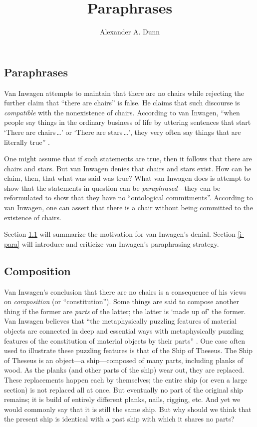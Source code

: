 \documentclass[11pt]{article}
\title{Paraphrases}
\author{Alexander A. Dunn}
\begin{document}
\ifstandalone
\maketitle
\begin{spacing}{1.5}
\fi

\section{Paraphrases}
\label{van-paraphrase}
Van Inwagen attempts to maintain that there are no chairs while
rejecting the further claim that ``there are chairs'' is false.  He
claims that such discourse is {\em compatible} with the nonexistence
of chairs.  According to van Inwagen, ``when people say things in the
ordinary business of life by uttering sentences that start `There are
chairs\,\ldots ' or `There are stars\,\ldots ', they very often say
things that are literally true'' \citep[102]{inwagen1995}.

One might assume that if such statements are true, then it follows
that there are chairs and stars.  But van Inwagen denies that chairs
and stars exist.  How can he claim, then, that what was said was true?
What van Inwagen does is attempt to show that the statements in
question can be {\em paraphrased}---they can be reformulated to show
that they have no ``ontological commitments''.  According to van
Inwagen, one can assert that there is a chair without being committed
to the existence of chairs.

Section \ref{comp} will summarize the motivation for van Inwagen's
denial.  Section \ref{i-para} will introduce and criticize van
Inwagen's paraphrasing strategy.

\subsection{Composition}
\label{comp}
Van Inwagen's conclusion that there are no chairs is a consequence of
his views on {\em composition} (or ``constitution'').  Some things are
said to compose another thing if the former are {\em parts} of the
latter; the latter is `made up of' the former.  Van Inwagen believes
that ``the metaphysically puzzling features of material objects are
connected in deep and essential ways with metaphysically puzzling
features of the constitution of material objects by their parts''
\citep[18]{inwagen1995}.  One case often used to illustrate these
puzzling features is that of the Ship of Theseus.  The Ship of Theseus
is an object---a ship---composed of many parts, including planks of
wood.  As the planks (and other parts of the ship) wear out, they are
replaced.  These replacements happen each by themselves; the entire
ship (or even a large section) is not replaced all at once.  But
eventually no part of the original ship remains; it is build of
entirely different planks, nails, rigging, etc.  And yet we would
commonly say that it is still the same ship.  But why should we think
that the present ship is identical with a past ship with which it
shares no parts?


\end{spacing}
\end{document}
